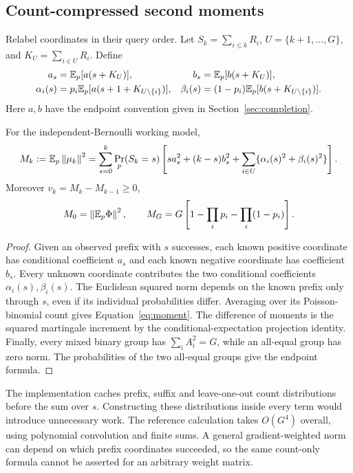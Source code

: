 \subsection{Count-compressed second moments}
Relabel coordinates in their query order. Let $S_k=\sum_{i\le k}R_i$, $U=\{k+1,\ldots,G\}$, and $K_U=\sum_{i\in U}R_i$. Define
\begin{align*}
 a_s&=\mathbb E_p[a(s+K_U)], & b_s&=\mathbb E_p[b(s+K_U)],\\
 \alpha_i(s)&=p_i\mathbb E_p[a(s+1+K_{U\setminus\{i\}})],&
 \beta_i(s)&=(1-p_i)\mathbb E_p[b(s+K_{U\setminus\{i\}})].
\end{align*}
Here $a,b$ have the endpoint convention given in Section~\ref{sec:completion}.
\begin{lemma}\label{lem:moments}
For the independent-Bernoulli working model,
\begin{equation}\label{eq:moment}
 M_k:=\mathbb E_p\left\lVert\mu_k\right\rVert^2
 =\sum_{s=0}^{k}\Pr_p(S_k=s)\left[
 s a_s^2+(k-s)b_s^2+
 \sum_{i\in U}\{\alpha_i(s)^2+\beta_i(s)^2\}\right].
\end{equation}
Moreover $v_k=M_k-M_{k-1}\ge0$,
\[
 M_0=\left\lVert\mathbb E_p\Phi\right\rVert^2,\qquad
 M_G=G\left[1-\prod_i p_i-\prod_i(1-p_i)\right].
\]
\end{lemma}
\begin{proof}
Given an observed prefix with $s$ successes, each known positive coordinate has conditional coefficient $a_s$ and each known negative coordinate has coefficient $b_s$. Every unknown coordinate contributes the two conditional coefficients $\alpha_i(s),\beta_i(s)$. The Euclidean squared norm depends on the known prefix only through $s$, even if its individual probabilities differ. Averaging over its Poisson-binomial count gives Equation~\eqref{eq:moment}. The difference of moments is the squared martingale increment by the conditional-expectation projection identity. Finally, every mixed binary group has $\sum_i A_i^2=G$, while an all-equal group has zero norm. The probabilities of the two all-equal groups give the endpoint formula.
\end{proof}
The implementation caches prefix, suffix and leave-one-out count distributions before the sum over $s$. Constructing these distributions inside every term would introduce unnecessary work. The reference calculation takes $O(G^4)$ overall, using polynomial convolution and finite sums. A general gradient-weighted norm can depend on which prefix coordinates succeeded, so the same count-only formula cannot be asserted for an arbitrary weight matrix.

